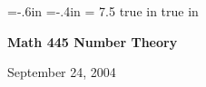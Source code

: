 





\loadmsbm

\nopagenumbers
\parindent=0pt

\voffset=-.6in
\hoffset=-.4in
\hsize = 7.5 true in
 true in


\overfullrule=0pt


\def\ctln{\centerline}
\def\u{\underbar}
\def\ssk{\smallskip}
\def\msk{\medskip}
\def\bsk{\bigskip}


\ctln{\bf Math 445 Number Theory}

\smallskip

\ctln{September 24, 2004}

\medskip

